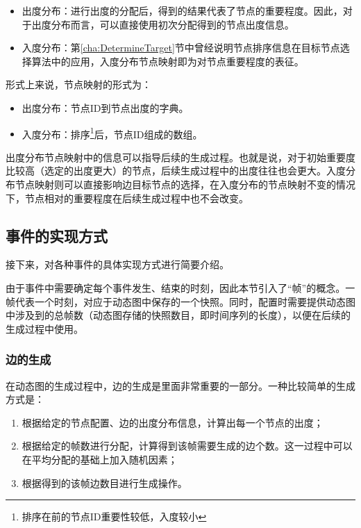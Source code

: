 \begin{itemize}
  \item 出度分布：进行出度的分配后，得到的结果代表了节点的重要程度。因此，对于出度分布而言，可以直接使用初次分配得到的节点出度信息。
  \item 入度分布：第\ref{cha:DetermineTarget}节中曾经说明节点排序信息在目标节点选择算法中的应用，入度分布节点映射即为对节点重要程度的表征。
\end{itemize}

\vspace{0.2cm}

形式上来说，节点映射的形式为：

\begin{itemize}
  \item 出度分布：节点ID到节点出度的字典。
  \item 入度分布：排序\footnote{排序在前的节点ID重要性较低，入度较小}后，节点ID组成的数组。
\end{itemize}

\vspace{0.2cm}

出度分布节点映射中的信息可以指导后续的生成过程。也就是说，对于初始重要度比较高（选定的出度更大）的节点，后续生成过程中的出度往往也会更大。入度分布节点映射则可以直接影响边目标节点的选择，在入度分布的节点映射不变的情况下，节点相对的重要程度在后续生成过程中也不会改变。

\subsection{事件的实现方式}

接下来，对各种事件的具体实现方式进行简要介绍。

由于事件中需要确定每个事件发生、结束的时刻，因此本节引入了“帧”的概念。一帧代表一个时刻，对应于动态图中保存的一个快照。同时，配置时需要提供动态图中涉及到的总帧数（动态图存储的快照数目，即时间序列的长度），以便在后续的生成过程中使用。

\subsubsection{边的生成}

在动态图的生成过程中，边的生成是里面非常重要的一部分。一种比较简单的生成方式是：

\begin{enumerate}
  \item 根据给定的节点配置、边的出度分布信息，计算出每一个节点的出度；
  \item 根据给定的帧数进行分配，计算得到该帧需要生成的边个数。这一过程中可以在平均分配的基础上加入随机因素；
  \item 根据得到的该帧边数目进行生成操作。
\end{enumerate}

